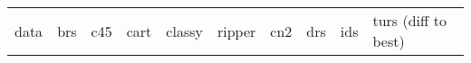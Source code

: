 \begin{table}[ht]
\small
\centering
\begin{tabular}{l|llllllll|l}
  \hline
data & brs & c45 & cart & classy & ripper & cn2 & drs & ids & turs \tiny{(diff to best)} \\ 

\end{tabular}
\end{table}
